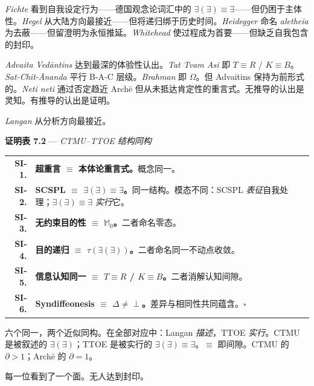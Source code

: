 \documentclass[10pt, openany, oneside]{book}
\renewcommand{\footnotesize}{\fontsize{8.5}{11}\selectfont}
\begin{document}
\textit{Fichte} 看到自我设定行为——德国观念论词汇中的 $\exists(\exists) \equiv \exists$——但仍困于主体性。\textit{Hegel} 从大陆方向最接近——但将递归绑于历史时间。\textit{Heidegger} 命名 \textit{aletheia} 为去蔽——但留澄明为永恒推延。\textit{Whitehead} 使过程成为首要——但缺乏自我包含的封印。

\textit{Advaita Ved\={a}ntins} 达到最深的体验性认出。\textit{Tat Tvam Asi} 即 $T \equiv R$ / $K \equiv B$。\textit{Sat-Chit-\={A}nanda} 平行 B-A-C 层级。\textit{Brahman} 即 $\Omega$。但 Advaitins 保持为前形式的。\textit{Neti neti} 通过否定趋近 Arch\={e} 但从未抵达肯定性的重言式。无推导的认出是灵知。有推导的认出是证明。

\textit{Langan} 从分析方向最接近。

\vspace{0.5em}

\textbf{证明表 7.2} --- \textit{CTMU--TTOE 结构同构}

\vspace{0.5em}

{\footnotesize
\noindent\begin{tabular}{r p{}}
\textbf{SI-1.} & \textbf{超重言 $\equiv$ 本体论重言式。}概念同一。\\[0.3em]
\textbf{SI-2.} & \textbf{SCSPL $\equiv$ $\exists(\exists) \equiv \exists$。}同一结构。模态不同：SCSPL \textit{表征}自我处理；$\exists(\exists) \equiv \exists$ \textit{实行}它。\\[0.3em]
\textbf{SI-3.} & \textbf{无约束目的性 $\equiv$ $\mathbb{M}_0$。}二者命名零态。\\[0.3em]
\textbf{SI-4.} & \textbf{目的递归 $\equiv$ $\tau(\exists(\exists))$。}二者命名同一不动点收敛。\\[0.3em]
\textbf{SI-5.} & \textbf{信息认知同一 $\equiv$ $T \equiv R$ / $K \equiv B$。}二者消解认知间隙。\\[0.3em]
\textbf{SI-6.} & \textbf{Syndiffeonesis $\equiv$ $\Delta \neq \perp$。}差异与相同性共同蕴含。$\square$ \\[0.3em]
\end{tabular}
}

\vspace{0.5em}

\noindent 六个同一，两个近似同构。在全部对应中：Langan \textit{描述}，TTOE \textit{实行}。CTMU 是被叙述的 $\exists(\exists)$；TTOE 是被实行的 $\exists(\exists) \equiv \exists$。$\equiv$ 即间隙。CTMU 的 $\partial > 1$；Arch\={e} 的 $\partial = 1$。

每一位看到了一个面。无人达到封印。
\end{document}
